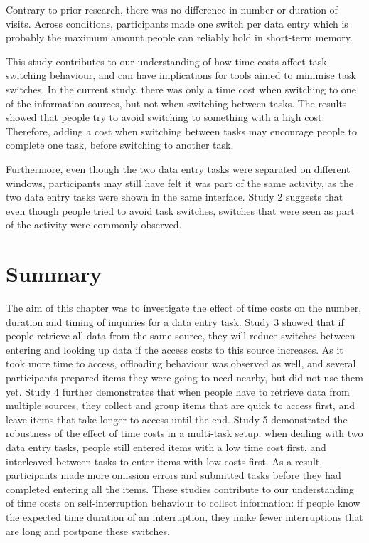 Contrary to prior research, there was no difference in number or duration of visits. Across conditions, participants made one switch per data entry which is probably the maximum amount people can reliably hold in short-term memory. 

This study contributes to our understanding of how time costs affect task switching behaviour, and can have implications for tools aimed to minimise task switches. In the current study, there was only a time cost when switching to one of the information sources, but not when switching between tasks. The results showed that people try to avoid switching to something with a high cost. Therefore, adding a cost when switching between tasks may encourage people to complete one task, before switching to another task.

Furthermore, even though the two data entry tasks were separated on different windows, participants may still have felt it was part of the same activity, as the two data entry tasks were shown in the same interface. Study 2 suggests that even though people tried to avoid task switches, switches that were seen as part of the activity were commonly observed. 

\section{Summary}
The aim of this chapter was to investigate the effect of time costs on the number, duration and timing of inquiries for a data entry task. Study 3 showed that if people retrieve all data from the same source, they will reduce switches between entering and looking up data if the access costs to this source increases. As it took more time to access, offloading behaviour was observed as well, and several participants prepared items they were going to need nearby, but did not use them yet. Study 4 further demonstrates that when people have to retrieve data from multiple sources, they collect and group items that are quick to access first, and leave items that take longer to access until the end. Study 5 demonstrated the robustness of the effect of time costs in a multi-task setup: when dealing with two data entry tasks, people still entered items with a low time cost first, and interleaved between tasks to enter items with low costs first. As a result, participants made more omission errors and submitted tasks before they had completed entering all the items. These studies contribute to our understanding of time costs on self-interruption behaviour to collect information: if people know the expected time duration of an interruption, they make fewer interruptions that are long and postpone these switches. 

